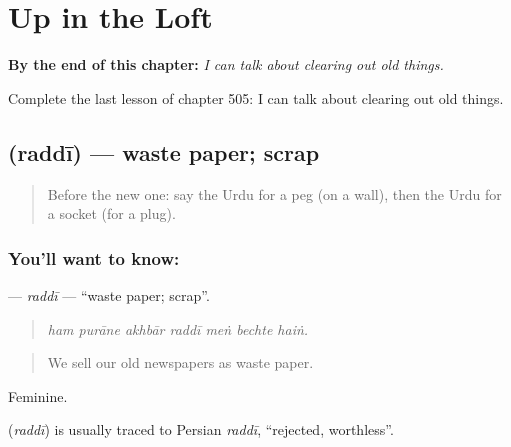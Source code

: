 
\chapter{Up in the Loft}
\label{ch:ur-up-in-the-loft}

\begin{chapteropening}
\textbf{By the end of this chapter:} \emph{I can talk about clearing out old things.}

Complete the last lesson of chapter 505: I can talk about clearing out old things.
\end{chapteropening}

\section[\texorpdfstring{\ur{ردی} (raddī)}{ردی (raddī)}]{ (raddī) — waste paper; scrap}

\label{lesson:UR-C505-raddi}



\begin{quote}
Before the new one: say the Urdu for a peg (on a wall), then the Urdu for a socket (for a plug).
\end{quote}

\subsection*{You'll want to know: }
\textbf{} — \emph{raddī} — \textquotedblleft{}waste paper; scrap\textquotedblright{}.

\begin{quote}
      
\end{quote}

\begin{quote}
\emph{ham purāne akhbār raddī meṅ bechte haiṅ.}
\end{quote}

\begin{quote}
We sell our old newspapers as waste paper.
\end{quote}

Feminine.

\begin{cousinweb}
\textbf{} (\emph{raddī}) is usually traced to Persian \emph{raddī}, \textquotedblleft{}rejected, worthless\textquotedblright{}.
\end{cousinweb}

